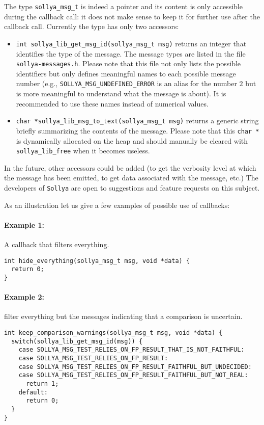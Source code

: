 \documentclass[a4paper]{article}
\newcommand{\sollya}{\texttt{Sollya}\xspace}
\begin{document}
The type \verb|sollya_msg_t| is indeed a pointer and its content is only accessible during the callback call: it does not make sense to keep it for further use after the callback call. Currently the type has only two accessors:
\begin{itemize}
\item \verb|int sollya_lib_get_msg_id(sollya_msg_t msg)| returns an integer that identifies the type of the message. The message types are listed in the file \verb|sollya-messages.h|. Please note that this file not only lists the possible identifiers but only defines meaningful names to each possible message number (e.g., \verb|SOLLYA_MSG_UNDEFINED_ERROR| is an alias for the number $2$ but is more meaningful to understand what the message is about). It is recommended to use these names instead of numerical values.
\item \verb|char *sollya_lib_msg_to_text(sollya_msg_t msg)| returns a generic string briefly summarizing the contents of the message. Please note that this \verb|char *| is dynamically allocated on the heap and should manually be cleared with \verb|sollya_lib_free| when it becomes useless.
\end{itemize}
In the future, other accessors could be added (to get the verbosity level at which the message has been emitted, to get data associated with the message, etc.) The developers of \sollya are open to suggestions and feature requests on this subject.

As an illustration let us give a few examples of possible use of callbacks:
\paragraph{Example 1:} A callback that filters everything.
\begin{center}
\begin{minipage}{15cm}\begin{Verbatim}[frame=single]
int hide_everything(sollya_msg_t msg, void *data) {
  return 0;
}
\end{Verbatim}
\end{minipage}\end{center}

\paragraph{Example 2:} filter everything but the messages indicating that a comparison is uncertain.
\begin{center}
\begin{minipage}{15cm}\begin{Verbatim}[frame=single]
int keep_comparison_warnings(sollya_msg_t msg, void *data) {
  switch(sollya_lib_get_msg_id(msg)) {
    case SOLLYA_MSG_TEST_RELIES_ON_FP_RESULT_THAT_IS_NOT_FAITHFUL:
    case SOLLYA_MSG_TEST_RELIES_ON_FP_RESULT:
    case SOLLYA_MSG_TEST_RELIES_ON_FP_RESULT_FAITHFUL_BUT_UNDECIDED:
    case SOLLYA_MSG_TEST_RELIES_ON_FP_RESULT_FAITHFUL_BUT_NOT_REAL:
      return 1;
    default:
      return 0;
  }
}
\end{Verbatim}
\end{minipage}\end{center}
\end{document}
